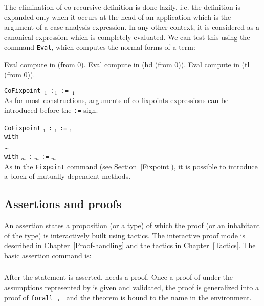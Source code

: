 The elimination of co-recursive definition is done lazily, i.e. the
definition is expanded only when it occurs at the head of an
application which is the argument of a case analysis expression.  In
any other context, it is considered as a canonical expression which is
completely evaluated. We can test this using the command
\texttt{Eval}, which computes the normal forms of a term:

\begin{coq_example}
Eval compute in (from 0).
Eval compute in (hd (from 0)).
Eval compute in (tl (from 0)).
\end{coq_example}

\begin{Variants}
\item{\tt CoFixpoint {\ident$_1$} {\params} :{\type$_1$} :=
  {\term$_1$}}\\ As for most constructions, arguments of co-fixpoints
  expressions can be introduced before the {\tt :=} sign.
\item{\tt CoFixpoint} {\ident$_1$} {\tt :} {\type$_1$} {\tt :=} {\term$_1$}\\
     {\tt with}\\
        \mbox{}\hspace{0.1cm} {\ldots} \\
        {\tt with} {\ident$_m$} {\tt :} {\type$_m$} {\tt :=} {\term$_m$}\\
As in the \texttt{Fixpoint} command (see Section~\ref{Fixpoint}), it
is possible to introduce a block of mutually dependent methods.
\end{Variants}

\subsection{Assertions and proofs}
\label{Assertions}

An assertion states a proposition (or a type) of which the proof (or
an inhabitant of the type) is interactively built using tactics. The
interactive proof mode is described in
Chapter~\ref{Proof-handling} and the tactics in Chapter~\ref{Tactics}.
The basic assertion command is:

\subsubsection{}

After the statement is asserted, {\Coq} needs a proof. Once a proof of
{\type} under the assumptions represented by {\binders} is given and
validated, the proof is generalized into a proof of {\tt forall
  \zeroone{\binders}, {\type}} and the theorem is bound to the name
{\ident} in the environment.

